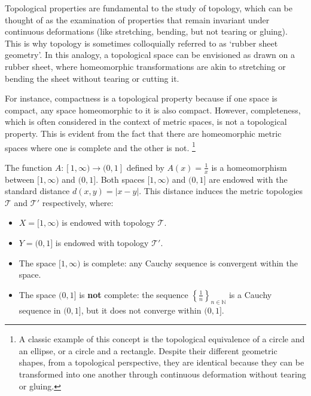 
Topological properties are fundamental to the study of topology, which can be thought of as the examination of properties that remain invariant under continuous deformations (like stretching, bending, but not tearing or gluing). This is why topology is sometimes colloquially referred to as ‘rubber sheet geometry’. In this analogy, a topological space can be envisioned as drawn on a rubber sheet, where homeomorphic transformations are akin to stretching or bending the sheet without tearing or cutting it.

For instance, compactness is a topological property because if one space is compact, any space homeomorphic to it is also compact. However, completeness, which is often considered in the context of metric spaces, is not a topological property. This is evident from the fact that there are homeomorphic metric spaces where one is complete and the other is not. \footnote{A classic example of this concept is the topological equivalence of a circle and an ellipse, or a circle and a rectangle. Despite their different geometric shapes, from a topological perspective, they are identical because they can be transformed into one another through continuous deformation without tearing or gluing.}

\begin{example}
    The function \( A: [1,\infty) \to (0,1] \) defined by \( A(x) = \frac{1}{x} \) is a homeomorphism between \([1,\infty)\) and \((0,1]\). Both spaces \([1,\infty)\) and \((0,1]\) are endowed with the standard distance \( d(x,y) = |x - y| \). This distance induces the metric topologies \( \mathcal{T} \) and \( \mathcal{T}' \) respectively, where:
\begin{itemize}
    \item \( X = [1,\infty) \) is endowed with topology \( \mathcal{T} \).
    \item \( Y = (0,1] \) is endowed with topology \( \mathcal{T}' \).
\end{itemize}

\begin{itemize}
    \item The space \( [1,\infty) \) is complete: any Cauchy sequence is convergent within the space.
    \item The space \( (0,1] \) is \textbf{not} complete: the sequence \( \left\{ \frac{1}{n} \right\}_{n \in \mathbb{N}} \) is a Cauchy sequence in \( (0,1] \), but it does not converge within \( (0,1] \).
\end{itemize}
\end{example}

